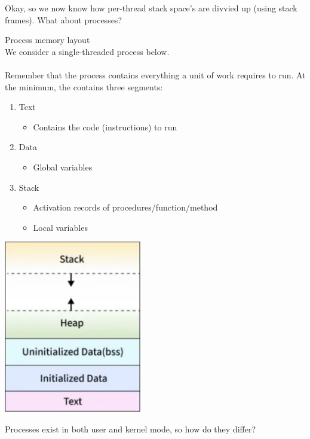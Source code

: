 \documentclass[journal, letterpaper]{IEEEtran}
\begin{document}
Okay, so we now know how per-thread stack space's are divvied up (using stack frames). What about processes?
\begin{theory}{Process memory layout} \\
    We consider a single-threaded process below. \\ \\
    Remember that the process contains everything a unit of work requires to run. At the minimum, the contains three segments:
    \begin{enumerate}
        \item Text
        \begin{itemize}
            \item Contains the code (instructions) to run
        \end{itemize}
        \item Data
        \begin{itemize}
            \item Global variables
        \end{itemize}
        \item Stack
        \begin{itemize}
            \item Activation records of procedures/function/method
            \item Local variables
        \end{itemize}
    \end{enumerate}
    \begin{center}
        \includegraphics[width=6cm]{./photos/process_memory.png}
    \end{center}
\end{theory}
Processes exist in both user and kernel mode, so how do they differ?
\end{document}
